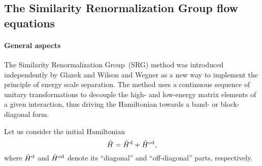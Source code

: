 \documentclass[aps,twocolumn,showpacs,floatfix,nofootinbib,preprintnumbers,superscriptaddress,amsmath,amssymb]{revtex4-1}
\newcommand{\Ho}{\hat{H}^{\rm od}}
\begin{document}
\subsection{The Similarity Renormalization Group flow equations}
\label{subsec:SRG}
\paragraph*{General aspects}
The Similarity Renormalization Group~(SRG) method was introduced independently by Glazek and Wilson \cite{PhysRevD.48.5863,*PhysRevD.49.4214} and Wegner \cite{PhysRepWegner0,*PhysRepWegner} as a new way to implement the principle of energy scale separation.
The method uses a continuous sequence of unitary transformations to decouple the high- and low-energy matrix elements of a given interaction, thus driving the Hamiltonian towards a band- or block-diagonal form. 

Let us consider the initial Hamiltonian
\[
 \hat{H} = \hat{H}^{\rm d} + \Ho,
\]
where $\hat{H}^{\rm d}$ and $\Ho$ denote its  ``diagonal'' and ``off-diagonal'' parts, respectively.
\end{document}
